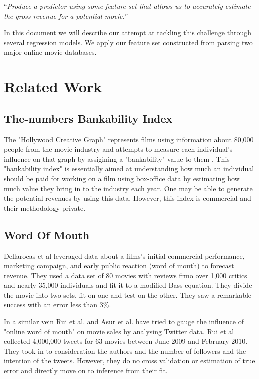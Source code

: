\documentclass[conference]{IEEEtran}
\begin{document}
 ``\textit{Produce a predictor using some feature set that allows us 
to accurately estimate the gross revenue for a potential movie.}''

In this document we will describe our attempt at tackling this challenge through
several regression models. We apply our feature set constructed from parsing two
major online movie databases.

\section{Related Work}
\subsection{The-numbers Bankability Index}
The "Hollywood Creative Graph" represents films using 
information about 80,000 people from the movie industry 
and attempts to measure each individual's influence 
on that graph by assigining a "bankability" value 
to them \cite{numbersbank}. This "bankability index" 
is essentially aimed at understanding how much an individual 
should be paid for working on a film using box-office data by 
estimating how much value they bring in to the industry each
year. One may be able to generate the potential revenues by using 
this data. However, this index is commercial and their methodology
private. 

\subsection{Word Of Mouth}
Dellarocas et al\cite{dellarocas} leveraged data about a films's initial commercial 
performance, marketing campaign, and early public reaction (word of mouth) 
to forecast revenue. They used a data set of 80 movies with reviews
frmo over 1,000 critics and nearly 35,000 individuals and fit it to a modified Bass equation. 
They divide the movie into two sets, fit on one and test on the other. They saw a remarkable
success with an error less than 3\%. 

In a similar vein Rui et al.\cite{rui} and Asur et al.\cite{asur} have tried to gauge the 
influence of "online word of mouth" on movie sales by analysing Twitter data. Rui et al
collected 4,000,000 tweets for 63 movies between June 2009 and February 2010. They took in 
to consideration the authors and the number of followers and the intention of the tweets.
However, they do no cross validation or estimation of true error and directly move on 
to inference from their fit.
\end{document}

